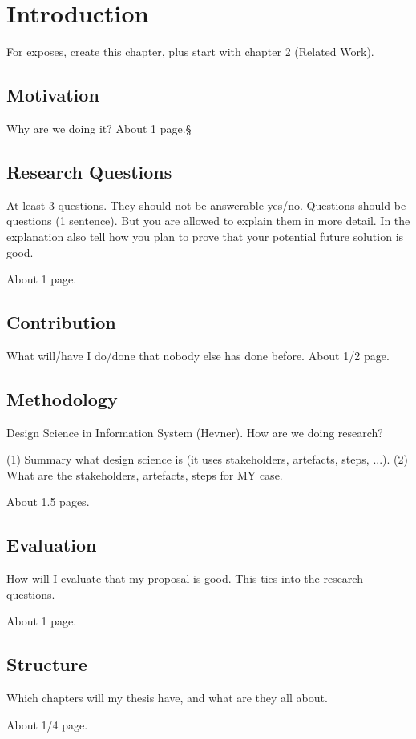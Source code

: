 \chapter{Introduction}
\label{sec:intro}

For exposes, create this chapter, plus start with chapter 2 (Related Work).

\section{Motivation}
\label{sec:intro:mo}

Why are we doing it? About 1 page.§

\section{Research Questions}
\label{sec:intro:rq}

At least 3 questions. They should not be answerable yes/no. Questions should be
questions (1 sentence). But you are allowed to explain them in more detail. In
the explanation also tell how you plan to prove that your potential future
solution is good.

About 1 page.

\section{Contribution}
\label{sec:intro:con}

What will/have I do/done that nobody else has done before. About 1/2 page.

\section{Methodology}
\label{sec:intro:meth}

Design Science in Information System (Hevner). How are we doing research?

(1) Summary what design science is (it uses stakeholders, artefacts, steps,
...). (2) What are the stakeholders, artefacts, steps for MY case.

About 1.5 pages.

\section{Evaluation}
\label{sec:intro:ev}

How will I evaluate that my proposal is good. This ties into the research questions.

About 1 page.

\section{Structure}
\label{sec:intro:struct}

Which chapters will my thesis have, and what are they all about.

About 1/4 page.
